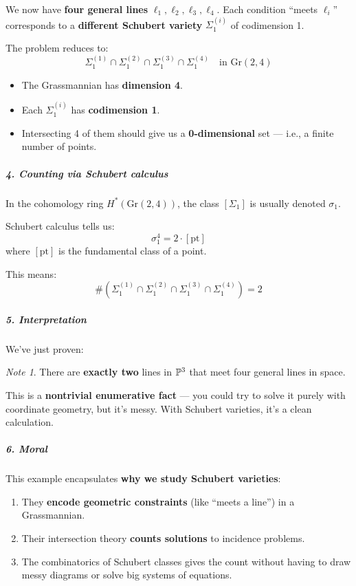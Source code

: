 \documentclass{amsart}
\let\originalmathbb\mathbb
\renewcommand{\mathbb}[1]{%
    \ifstrequal{#1}{1}{\mathbbm{#1}}{\originalmathbb{#1}}%
}
\theoremstyle{plain}
\theoremstyle{definition}
\theoremstyle{remark}
\newtheorem{note}[theorem]{Note}
\begin{document}
We now have \textbf{four general lines} $\ell_1, \ell_2, \ell_3, \ell_4$. Each condition “meets $\ell_i$” corresponds to a \textbf{different Schubert variety} $\Sigma_1^{(i)}$ of codimension 1.

The problem reduces to:
\[
\Sigma_1^{(1)} \cap \Sigma_1^{(2)} \cap \Sigma_1^{(3)} \cap \Sigma_1^{(4)} \quad \text{in } \mathrm{Gr}(2,4)
\]
\begin{itemize}
	\item The Grassmannian has \textbf{dimension 4}.
	\item Each $\Sigma_1^{(i)}$ has \textbf{codimension 1}.
	\item Intersecting 4 of them should give us a \textbf{0-dimensional} set — i.e., a finite number of points.
\end{itemize}

\subparagraph{4. Counting via Schubert calculus}

In the cohomology ring $H^*(\mathrm{Gr}(2,4))$, the class $[\Sigma_1]$ is usually denoted $\sigma_1$.

Schubert calculus tells us:
\[
\sigma_1^4 = 2 \cdot [\text{pt}]
\]
where $[\text{pt}]$ is the fundamental class of a point.

This means:
\[
\# \left( \Sigma_1^{(1)} \cap \Sigma_1^{(2)} \cap \Sigma_1^{(3)} \cap \Sigma_1^{(4)} \right) = 2
\]
\subparagraph{5. Interpretation}

We’ve just proven:

\begin{note}
There are \textbf{exactly two} lines in $\mathbb{P}^3$ that meet four general lines in space.
\end{note}
This is a \textbf{nontrivial enumerative fact} — you could try to solve it purely with coordinate geometry, but it’s messy. With Schubert varieties, it’s a clean calculation.

\subparagraph{6. Moral}

This example encapsulates \textbf{why we study Schubert varieties}:

\begin{enumerate}
	\item They \textbf{encode geometric constraints} (like “meets a line”) in a Grassmannian.
	\item Their intersection theory \textbf{counts solutions} to incidence problems.
	\item The combinatorics of Schubert classes gives the count without having to draw messy diagrams or solve big systems of equations.
\end{enumerate}
\end{document}
